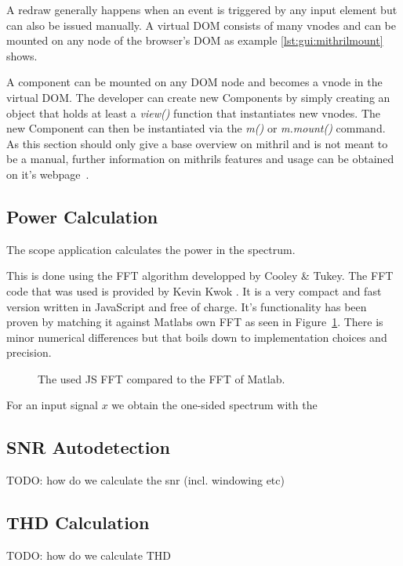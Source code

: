 A redraw generally happens when an event is triggered by any input element but can also be issued manually.
A virtual DOM consists of many vnodes and can be mounted on any node of the browser's DOM as example \ref{lst:gui:mithrilmount} shows.


A component can be mounted on any DOM node and becomes a vnode in the virtual DOM. The developer can create new Components by simply creating an object that holds at least a \textit{view()} function that instantiates new vnodes.
The new Component can then be instantiated via the \textit{m()} or \textit{m.mount()} command.
As this section should only give a base overview on mithril and is not meant to be a manual, further information on mithrils features and usage can be obtained on it's webpage~\cite{mithril::home}.

\subsection{Power Calculation}

The scope application calculates the power in the spectrum.

This is done using the FFT algorithm developped by Cooley \& Tukey. The FFT code that was used is provided by Kevin Kwok \cite{kwok}. It is a very compact and fast version written in JavaScript and free of charge. It's functionality has been proven by matching it against Matlabs own FFT as seen in Figure~\ref{fig:gui:fft_comparison}. There is minor numerical differences but that boils down to implementation choices and precision.

\begin{figure}
    \centering
    
    \caption[FFT comparison]{%
        The used JS FFT compared to the FFT of Matlab.%
    }
    \label{fig:gui:fft_comparison}
\end{figure}

For an input signal $x$ we obtain the one-sided spectrum with the 

\subsection{SNR Autodetection}

TODO: how do we calculate the snr (incl. windowing etc)

\subsection{THD Calculation}

TODO: how do we calculate THD


